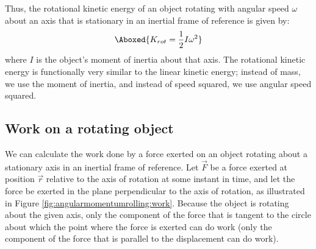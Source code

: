 Thus, the rotational kinetic energy of an object rotating with angular speed $\omega$ about an axis that is stationary in an inertial frame of reference is given by:
\begin{align}
\Aboxed{K_{rot}=\frac{1}{2}I\omega^2}
\end{align}
where $I$ is the object's moment of inertia about that axis. The rotational kinetic energy is functionally very similar to the linear kinetic energy; instead of mass, we use the moment of inertia, and instead of speed squared, we use angular speed squared. 

\subsection{Work on a rotating object}
We can calculate the work done by a force exerted on an object rotating about a stationary axis in an inertial frame of reference. Let $\vec F$ be a force exerted at position $\vec r$ relative to the axis of rotation at some instant in time, and let the force be exerted in the plane perpendicular to the axis of rotation, as illustrated in Figure \ref{fig:angularmomentumrolling:work}. Because the object is rotating about the given axis, only the component of the force that is tangent to the circle about which the point where the force is exerted can do work (only the component of the force that is parallel to the displacement can do work). 

